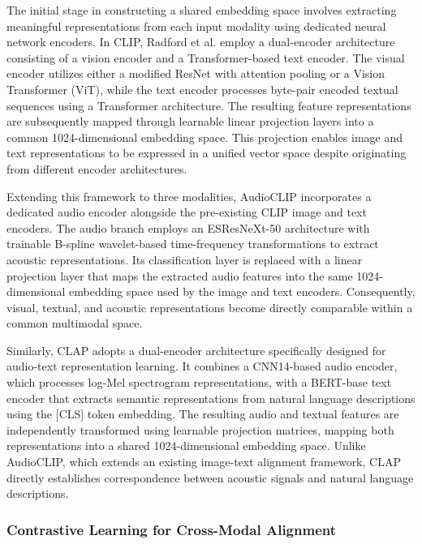 \documentclass[pdflatex,sn-mathphys-num]{sn-jnl}%
\theoremstyle{thmstyleone}%
\theoremstyle{thmstyletwo}%
\theoremstyle{thmstylethree}%
\begin{document}
The initial stage in constructing a shared embedding space involves extracting meaningful representations from each input modality using dedicated neural network encoders. In CLIP, Radford et al. employ a dual-encoder architecture consisting of a vision encoder and a Transformer-based text encoder. The visual encoder utilizes either a modified ResNet with attention pooling or a Vision Transformer (ViT), while the text encoder processes byte-pair encoded textual sequences using a Transformer architecture. The resulting feature representations are subsequently mapped through learnable linear projection layers into a common 1024-dimensional embedding space. This projection enables image and text representations to be expressed in a unified vector space despite originating from different encoder architectures.

Extending this framework to three modalities, AudioCLIP incorporates a dedicated audio encoder alongside the pre-existing CLIP image and text encoders. The audio branch employs an ESResNeXt-50 architecture with trainable B-spline wavelet-based time-frequency transformations to extract acoustic representations. Its classification layer is replaced with a linear projection layer that maps the extracted audio features into the same 1024-dimensional embedding space used by the image and text encoders. Consequently, visual, textual, and acoustic representations become directly comparable within a common multimodal space.

Similarly, CLAP adopts a dual-encoder architecture specifically designed for audio-text representation learning. It combines a CNN14-based audio encoder, which processes log-Mel spectrogram representations, with a BERT-base text encoder that extracts semantic representations from natural language descriptions using the [CLS] token embedding. The resulting audio and textual features are independently transformed using learnable projection matrices, mapping both representations into a shared 1024-dimensional embedding space. Unlike AudioCLIP, which extends an existing image-text alignment framework, CLAP directly establishes correspondence between acoustic signals and natural language descriptions.

\subsubsection{Contrastive Learning for Cross-Modal Alignment}
\end{document}
